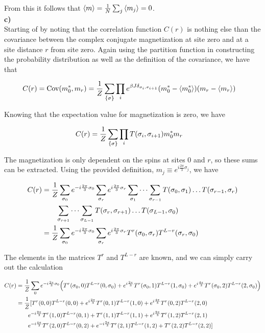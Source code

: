 \documentclass[12pt]{article}
\begin{document}
From this it follows that $\expval{m} = \frac{1}{N}\sum_j\expval{m_j} = 0$.
\\
\textbf{c)} \\

Starting of by noting that the correlation function $C(r)$ is nothing else than
the covariance between the complex conjugate magnetization at site zero and at
a site distance $r$ from site zero.
Again using the partition function in constructing the probability distribution
as well as the definition of the covariance, we have that

\begin{align*}
    C(r) = \text{Cov}(m_0^*, m_r) &= \frac{1}{Z}\sum_{\{\sigma\}}\prod_i e^{\beta
    J\delta_{\sigma_i, \sigma_{i+1}}}\qty(m_0^* - \expval{m_0^*})\qty(m_r -
    \expval{m_r})
\end{align*}

Knowing that the expectation value for magnetization is zero, we have

\begin{align*}
    C(r) &= \frac{1}{Z}\sum_{\{\sigma\}}\prod_iT\qty(\sigma_i, \sigma_{i+1})
    m_0^*m_r
\end{align*}

The magnetization is only dependent on the spins at sites $0$ and $r$, so these
sums can be extracted. Using the provided definition, $m_j \equiv 
e^{i\frac{2\pi}{3}\sigma_j}$, we have

\begin{align*}
    C(r) &=
    \frac{1}{Z}\sum_{\sigma_0}e^{-i\frac{2\pi}{3}\sigma_0}\sum_{\sigma_r}
    e^{i\frac{2\pi}{3}\sigma_r} \sum_{\sigma_1}\dots
    \sum_{\sigma_{r-1}} T\qty(\sigma_0, \sigma_1)\dots
    T\qty(\sigma_{r-1}, \sigma_r) \\ &\qquad \sum_{\sigma_{r+1}}\dots
    \sum_{\sigma_{L-1}}T\qty(\sigma_r, \sigma_{r+1}) \dots T\qty(\sigma_{L-1},
    \sigma_0) \\
    &= \frac{1}{Z}\sum_{\sigma_0}e^{-i\frac{2\pi}{3}\sigma_0}
    \sum_{\sigma_r}e^{i\frac{2\pi}{3}\sigma_r} T^r\qty(\sigma_0,
    \sigma_r)T^{L-r}\qty(\sigma_r, \sigma_0)
\end{align*}

The elements in the matrices $T^r$ and $T^{L-r}$ are known, and we can simply
carry out the calculation

\begin{align*}
    C(r) &= \frac{1}{Z}\sum_0e^{-i\frac{2\pi}{3}\sigma_0}\qty(
    T^r\qty(\sigma_0, 0)T^{L-r}\qty(0, \sigma_0) +
    e^{i\frac{2\pi}{3}}T^r\qty(\sigma_0, 1)T^{L-r}\qty(1, \sigma_0) +
    e^{i\frac{4\pi}{3}}T^r\qty(\sigma_0, 2)T^{L-r}\qty(2, \sigma_0)) \\
    &= \frac{1}{Z} [T^r(0, 0)T^{L-r}(0, 0) + e^{i\frac{2\pi}{3}}T^r(0,
    1)T^{L-r}(1, 0) + e^{i\frac{4\pi}{3}}T^r(0, 2)T^{L-r}(2, 0) \\
    &\qquad e^{-i\frac{2\pi}{3}}T^r(1, 0)T^{L-r}(0, 1) + T^r(1, 1)T^{L-r}(1, 1)
    + e^{i\frac{2\pi}{3}}T^r(1, 2)T^{L-r}(2, 1) \\
    &\qquad e^{-i\frac{4\pi}{3}}T^r(2, 0)T^{L-r}(0, 2) +
    e^{-i\frac{2\pi}{3}}T^r(2, 1)T^{L-r}(1, 2) + T^r(2, 2)T^{L-r}(2, 2)]
\end{align*}
\end{document}
